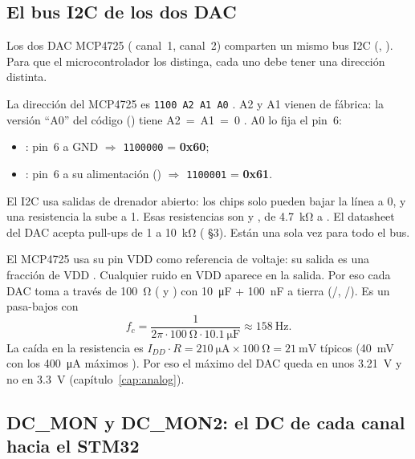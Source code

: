 \subsection{El bus I2C de los dos DAC}

Los dos DAC MCP4725 ( canal~1,  canal~2) comparten un mismo bus I2C (, ). Para que el microcontrolador los distinga, cada uno debe tener una dirección distinta.

\begin{calculo}
La dirección del MCP4725 es \texttt{1100\,A2\,A1\,A0} . A2 y A1 vienen de fábrica: la versión ``A0'' del código () tiene A2~=~A1~=~0 . A0 lo fija el pin~6:
\begin{itemize}
  \item {}: pin~6 a GND $\Rightarrow$ \texttt{1100000} = \textbf{0x60};
  \item {}: pin~6 a su alimentación () $\Rightarrow$ \texttt{1100001} = \textbf{0x61}.
\end{itemize}
\end{calculo}

El I2C usa salidas de drenador abierto: los chips solo pueden bajar la línea a 0, y una resistencia la sube a 1. Esas resistencias son  y , de \SI{4.7}{\kilo\ohm} a . El datasheet del DAC acepta pull-ups de 1 a \SI{10}{\kilo\ohm}  ( §3). Están una sola vez para todo el bus.

\begin{idea}
El MCP4725 usa su pin VDD como referencia de voltaje: su salida es una fracción de VDD . Cualquier ruido en VDD aparece en la salida. Por eso cada DAC toma  a través de \SI{100}{\ohm} ( y ) con \SI{10}{\micro\farad} + \SI{100}{\nano\farad} a tierra (/, /). Es un pasa-bajos con
\[
f_c=\frac{1}{2\pi\cdot\SI{100}{\ohm}\cdot\SI{10.1}{\micro\farad}}\approx\SI{158}{\hertz}.
\]
La caída en la resistencia es $I_{DD}\cdot R=\SI{210}{\micro\ampere}\times\SI{100}{\ohm}=\SI{21}{\milli\volt}$ típicos (\SI{40}{\milli\volt} con los \SI{400}{\micro\ampere} máximos ). Por eso el máximo del DAC queda en unos \SI{3.21}{\volt} y no en \SI{3.3}{\volt} (capítulo~\ref{cap:analog}).
\end{idea}

\subsection{DC\_MON y DC\_MON2: el DC de cada canal hacia el STM32}

